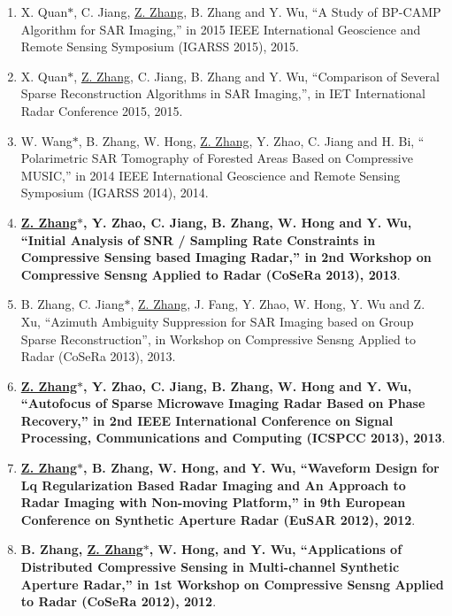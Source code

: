 \documentclass[paper=a4,fontsize=11pt]{scrartcl}
\begin{document}
\begin{enumerate}
\item X. Quan$\ast$, C. Jiang, \underline{Z. Zhang}, B. Zhang and Y. Wu, ``A Study of BP-CAMP Algorithm for SAR Imaging,'' in 2015 IEEE International Geoscience and Remote Sensing Symposium (IGARSS 2015), 2015.

\item X. Quan$\ast$, \underline{Z. Zhang}, C. Jiang, B. Zhang and Y. Wu, ``Comparison of Several Sparse Reconstruction Algorithms in SAR Imaging,'', in IET International Radar Conference 2015, 2015.

\item W. Wang$\ast$, B. Zhang, W. Hong, \underline{Z. Zhang}, Y. Zhao, C. Jiang and H. Bi, `` Polarimetric SAR Tomography of Forested Areas Based on Compressive MUSIC,'' in 2014 IEEE International Geoscience and Remote Sensing Symposium (IGARSS 2014), 2014.
	
\item \textbf{\underline{Z. Zhang$\ast$}, Y. Zhao, C. Jiang, B. Zhang, W. Hong and Y. Wu, ``Initial Analysis of SNR / Sampling Rate Constraints in Compressive Sensing based Imaging Radar,'' in 2nd Workshop on Compressive Sensng Applied to Radar (CoSeRa 2013), 2013}.

\item B. Zhang, C. Jiang$\ast$, \underline{Z. Zhang}, J. Fang, Y. Zhao, W. Hong, Y. Wu and Z. Xu, ``Azimuth Ambiguity Suppression for SAR Imaging based on Group Sparse Reconstruction'', in Workshop on Compressive Sensng Applied to Radar (CoSeRa 2013), 2013.
	
\item \textbf{\underline{Z. Zhang$\ast$}, Y. Zhao, C. Jiang, B. Zhang, W. Hong and Y. Wu, ``Autofocus of Sparse Microwave Imaging Radar Based on Phase Recovery,'' in 2nd IEEE International Conference on Signal Processing, Communications and Computing (ICSPCC 2013), 2013}.

\item \textbf{\underline{Z. Zhang$\ast$}, B. Zhang, W. Hong, and Y. Wu, ``Waveform Design for Lq Regularization Based Radar Imaging and An Approach to Radar Imaging with Non-moving Platform,'' in 9th European Conference on Synthetic Aperture Radar (EuSAR 2012), 2012}.

\item \textbf{B. Zhang, \underline{Z. Zhang$\ast$}, W. Hong, and Y. Wu, ``Applications of Distributed Compressive Sensing in Multi-channel Synthetic Aperture Radar,'' in 1st Workshop on Compressive Sensng Applied to Radar (CoSeRa 2012), 2012}.

\end{enumerate}
\end{document}
